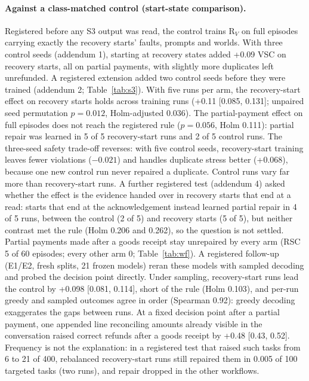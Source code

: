 \documentclass[11pt]{article}
\newcommand{\RV}{R$_V$}
\begin{document}
\paragraph{Against a class-matched control (start-state comparison).} Registered before any S3 output was read, the control trains \RV{} on full episodes carrying exactly the recovery starts' faults, prompts and worlds. With three control seeds (addendum 1), starting at recovery states added +0.09 VSC on recovery starts, all on partial payments, with slightly more duplicates left unrefunded. A registered extension added two control seeds before they were trained (addendum 2; Table~\ref{tab:s3}). With five runs per arm, the recovery-start effect on recovery starts holds across training runs (+0.11 [0.085, 0.131]; unpaired seed permutation $p=0.012$, Holm-adjusted 0.036). The partial-payment effect on full episodes does not reach the registered rule ($p=0.056$, Holm 0.111): partial repair was learned in 5 of 5 recovery-start runs and 2 of 5 control runs. The three-seed safety trade-off reverses: with five control seeds, recovery-start training leaves fewer violations ($-0.021$) and handles duplicate stress better (+0.068), because one new control run never repaired a duplicate. Control runs vary far more than recovery-start runs. A further registered test (addendum 4) asked whether the effect is the evidence handed over in recovery starts that end at a read: starts that end at the acknowledgement instead learned partial repair in 4 of 5 runs, between the control (2 of 5) and recovery starts (5 of 5), but neither contrast met the rule (Holm 0.206 and 0.262), so the question is not settled. Partial payments made after a goods receipt stay unrepaired by every arm (RSC 5 of 60 episodes; every other arm 0; Table~\ref{tab:wf}). A registered follow-up (E1/E2, fresh splits, 21 frozen models) reran these models with sampled decoding and probed the decision point directly. Under sampling, recovery-start runs lead the control by +0.098 [0.081, 0.114], short of the rule (Holm 0.103), and per-run greedy and sampled outcomes agree in order (Spearman 0.92): greedy decoding exaggerates the gaps between runs. At a fixed decision point after a partial payment, one appended line reconciling amounts already visible in the conversation raised correct refunds after a goods receipt by +0.48 [0.43, 0.52]. Frequency is not the explanation: in a registered test that raised such tasks from 6 to 21 of 400, rebalanced recovery-start runs still repaired them in 0.005 of 100 targeted tasks (two runs), and repair dropped in the other workflows.
\end{document}
